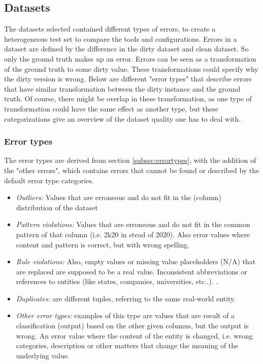 \subsection{Datasets}
\label{subsec:datasets}
The datasets selected contained different types of errors, to create a heterogeneous test set to compare the tools and configurations. Errors in a dataset are defined by the difference in the dirty dataset and clean dataset. So only the ground truth makes up an error. Errors can be seen as a transformation of the ground truth to some dirty value. These transformations could specify why the dirty version is wrong. Below are different "error types" that describe errors that have similar transformation between the dirty instance and the ground truth. Of course, there might be overlap in these transformation, as one type of transformation could have the same effect as another type, but these categorizations give an overview of the dataset quality one has to deal with.

\subsubsection{Error types}
The error types are derived from section \ref{subsec:errortypes}, with the addition of the "other errors", which contains errors that cannot be found or described by the default error type categories.

\begin{itemize}
    \item \textit{Outliers:} Values that are erroneous and do not fit in the (column) distribution of the dataset
    \item \textit{Pattern violations:} Values that are erroneous and do not fit in the common pattern of that column (i.e. 2k20 in stead of 2020). Also error values where content and pattern is correct, but with wrong spelling.
    \item \textit{Rule violations:} Also, empty values or missing value placeholders (N/A) that are replaced are supposed to be a real value. Inconsistent abbreviations or references to entities (like states, companies, universities, etc..).
    .\item \textit{Duplicates:} are different tuples, referring to the same real-world entity.
    \item \textit{Other error types:} examples of this type are values that are result of a classification (output) based on the other given columns, but the output is wrong. An error value where the content of the entity is changed, i.e. wrong categories, description or other matters that change the meaning of the underlying value.
\end{itemize}


